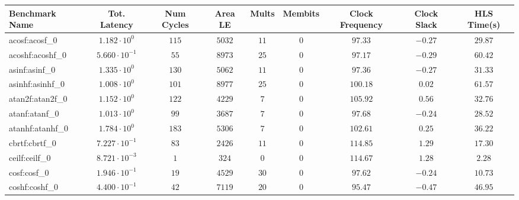 \begin{tabular}{|l|c|c|c|c|c|c|c|c|}
\hline
Benchmark Name               & Tot. Latency            & Num Cycles & Area LE    & Mults   & Membits  & Clock Frequency & Clock Slack & HLS Time(s) \\
\hline
acosf:acosf\_0               & $ 1.182 \cdot 10^{0}  $ & $ 115    $ & $ 5032   $ & $ 11  $ & $ 0    $ & $ 97.33       $ & $ -0.27   $ & $ 29.87   $ \\
acoshf:acoshf\_0             & $ 5.660 \cdot 10^{-1} $ & $ 55     $ & $ 8973   $ & $ 25  $ & $ 0    $ & $ 97.17       $ & $ -0.29   $ & $ 60.42   $ \\
asinf:asinf\_0               & $ 1.335 \cdot 10^{0}  $ & $ 130    $ & $ 5062   $ & $ 11  $ & $ 0    $ & $ 97.36       $ & $ -0.27   $ & $ 31.33   $ \\
asinhf:asinhf\_0             & $ 1.008 \cdot 10^{0}  $ & $ 101    $ & $ 8977   $ & $ 25  $ & $ 0    $ & $ 100.18      $ & $ 0.02    $ & $ 61.57   $ \\
atan2f:atan2f\_0             & $ 1.152 \cdot 10^{0}  $ & $ 122    $ & $ 4229   $ & $ 7   $ & $ 0    $ & $ 105.92      $ & $ 0.56    $ & $ 32.76   $ \\
atanf:atanf\_0               & $ 1.013 \cdot 10^{0}  $ & $ 99     $ & $ 3687   $ & $ 7   $ & $ 0    $ & $ 97.68       $ & $ -0.24   $ & $ 28.52   $ \\
atanhf:atanhf\_0             & $ 1.784 \cdot 10^{0}  $ & $ 183    $ & $ 5306   $ & $ 7   $ & $ 0    $ & $ 102.61      $ & $ 0.25    $ & $ 36.22   $ \\
cbrtf:cbrtf\_0               & $ 7.227 \cdot 10^{-1} $ & $ 83     $ & $ 2426   $ & $ 11  $ & $ 0    $ & $ 114.85      $ & $ 1.29    $ & $ 17.30   $ \\
ceilf:ceilf\_0               & $ 8.721 \cdot 10^{-3} $ & $ 1      $ & $ 324    $ & $ 0   $ & $ 0    $ & $ 114.67      $ & $ 1.28    $ & $ 2.28    $ \\
cosf:cosf\_0                 & $ 1.946 \cdot 10^{-1} $ & $ 19     $ & $ 4529   $ & $ 30  $ & $ 0    $ & $ 97.62       $ & $ -0.24   $ & $ 10.73   $ \\
coshf:coshf\_0               & $ 4.400 \cdot 10^{-1} $ & $ 42     $ & $ 7119   $ & $ 20  $ & $ 0    $ & $ 95.47       $ & $ -0.47   $ & $ 46.95   $ \\

\end{tabular}
